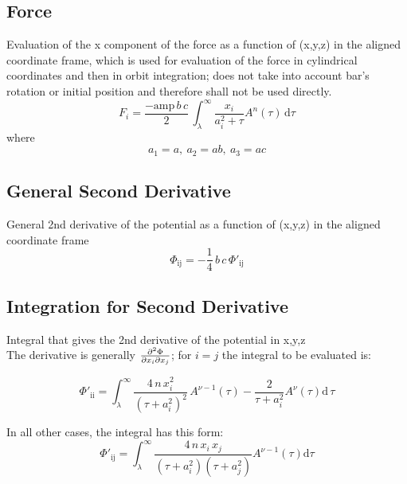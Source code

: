 \documentclass[a4paper,11pt]{article}
\begin{document}
		\subsection{Force} %
			Evaluation of the x component of the force as a function of (x,y,z) in the aligned coordinate frame, which is used for evaluation of the force in cylindrical coordinates and then in orbit integration; does not take into account bar's rotation or initial position and therefore shall not be used directly.\\
   		\begin{equation}
   		F_i = \frac{-\mathrm{amp}\,b\,c}{2}\, \int_{\lambda}^{\infty} \frac{x_i}{a_i^2 + \tau} A^{n}(\tau)\,\mathrm{d} \tau
   		\end{equation}  
		where
		\begin{equation*}
			a_1 = a,~ a_2 = ab,~a_3 = ac
		\end{equation*}
		
		
		\subsection{General Second Derivative}
			General 2nd derivative of the potential as a function of (x,y,z) in the aligned coordinate frame \\
		\begin{equation}
		\Phi_{\mathrm{ij}} = -\frac{1}{4}\,b\,c \,\Phi'_{\mathrm{ij}}	
		\end{equation}
		
		\subsection{Integration for Second Derivative}
			Integral that gives the 2nd derivative of the potential in x,y,z \\
			
			\noindent The derivative is generally $ \pdv{\Phi}{x_i}{x_j} $; for $ i=j $ the integral to be evaluated is: 
			
		\begin{equation}
		\Phi'_{\mathrm{ii}} = \int_{\lambda}^{\infty} 
		 \frac{4\,n\,x_i^2}{(\tau + a_i^2)^2} \,A^{\nu-1}(\tau)
		- \frac{2}{\tau + a_i^2} A^{\nu}(\tau) \mathrm{d}\,\tau
		\end{equation}
		
			\noindent In all other cases, the integral has this form:
		\begin{equation}
		\Phi'_{\mathrm{ij}} = \int_{\lambda}^{\infty} 
		\frac{4\,n\,x_i\,x_j}{(\tau + a_i^2)(\tau + a_j^2)} A^{\nu-1}(\tau) \mathrm{d}\tau
		\end{equation}
\end{document}
